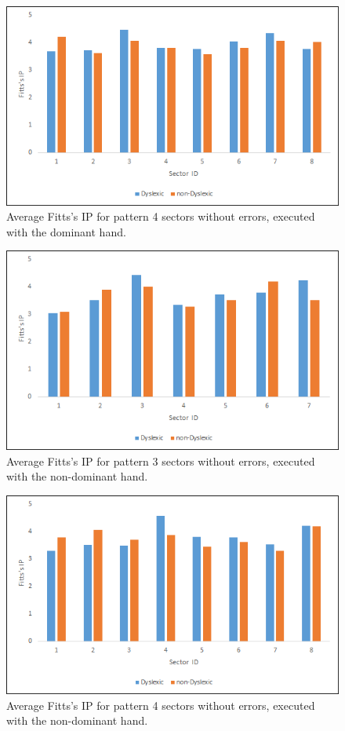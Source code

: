 	\begin{figure}[]
		\centering
		\includegraphics[width = \textwidth]{../images/pat_4_ip_val_dom}
		\caption{Average Fitts's IP for pattern 4 sectors without errors, executed with the dominant hand.}
		\label{fi_pat_4_ip_dom}
	\end{figure}

	\begin{figure}[]
		\centering
		\includegraphics[width = \textwidth]{../images/pat_3_ip_val_ndom}
		\caption{Average Fitts's IP for pattern 3 sectors without errors, executed with the non-dominant hand.}
		\label{fi_pat_3_ip_ndom}
	\end{figure}		
	
	\begin{figure}[]
		\centering
		\includegraphics[width = \textwidth]{../images/pat_4_ip_val_ndom}
		\caption{Average Fitts's IP for pattern 4 sectors without errors, executed with the non-dominant hand.}
		\label{fi_pat_4_ip_ndom}
	\end{figure}
			

